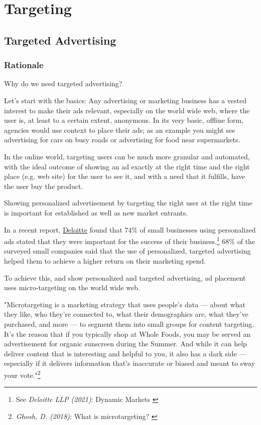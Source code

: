 %
%

\pagebreak
\section{Targeting}

\onehalfspacing

\subsection{Targeted Advertising}

\subsubsection{Rationale}

Why do we need targeted advertising?

Let's start with the basics: Any advertising or marketing business has a vested interest to make their ads relevant, especially on the world wide web, where the user is, at least to a certain extent, anonymous. In its very basic, offline form, agencies would use context to place their ads; as an example you might see advertising for cars on busy roads or advertising for food near supermarkets.

In the online world, targeting users can be much more granular and automated, with the ideal outcome of showing an ad exactly at the right time and the right place (e.g. web site) for the user to see it, and with a need that it fulfills, have the user buy the product.

Showing personalized advertisement by targeting the right user at the right time is important for established as well as new market entrants.

In a recent report, \href{https://www2.deloitte.com/de/de.html}{Deloitte} found that 74\% of small businesses using personalized ads stated that they were important for the success of their business.\footnote{See \textit{Deloitte LLP (2021)}: Dynamic Markets \cite{deloitteSmb}} 68\% of the surveyed small companies said that the use of personalized, targeted advertising helped them to achieve a higher return on their marketing spend.

To achieve this, and show personalized and targeted advertising, ad placement uses micro-targeting on the world wide web.

"Microtargeting is a marketing strategy that uses people’s data — about what they like, who they’re connected to, what their demographics are, what they’ve purchased, and more — to segment them into small groups for content targeting. It’s the reason that if you typically shop at Whole Foods, you may be served an advertisement for organic sunscreen during the Summer. And while it can help deliver content that is interesting and helpful to you, it also has a dark side — especially if it delivers information that’s inaccurate or biased and meant to sway your vote."\footnote{\textit{Ghosh, D. (2018)}: What is microtargeting? \cite{mozillaBlog}}

